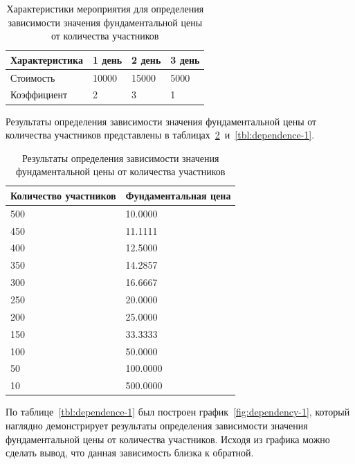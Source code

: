 \begin{table}[H]
	\centering
	\caption{Характеристики мероприятия для определения зависимости значения фундаментальной цены от количества участников}
	\label{tbl:event-chars-1}
	\begin{tabularx}{\textwidth}{|X|X|X|X|}
		\hline
		\textbf{Характеристика} & \textbf{1 день} & \textbf{2 день} & \textbf{3 день} \\
		\hline
		Стоимость & 10000 & 15000 & 5000 \\
		\hline
		Коэффициент & 2 & 3 & 1 \\
		\hline
	\end{tabularx}
\end{table}

Результаты определения зависимости значения фундаментальной цены от количества участников представлены в таблицах~\ref{tbl:short-dependence-1}~и~\ref{tbl:dependence-1}.

\begin{table}[H]
	\centering
	\caption{Результаты определения зависимости значения фундаментальной цены от количества участников}
	\label{tbl:short-dependence-1}
	\begin{tabularx}{\textwidth}{|X|X|}
		\hline
		\textbf{Количество участников} & \textbf{Фундаментальная цена} \\
		\hline
		500  & 10.0000         \\ \hline
		450  & 11.1111         \\ \hline
		400  & 12.5000         \\ \hline
		350  & 14.2857         \\ \hline
		300  & 16.6667         \\ \hline
		250  & 20.0000         \\ \hline
		200  & 25.0000         \\ \hline
		150  & 33.3333         \\ \hline
		100  & 50.0000         \\ \hline
		50   & 100.0000        \\ \hline
		10   & 500.0000        \\ \hline
	\end{tabularx}
\end{table}

По таблице~\ref{tbl:dependence-1} был построен график~\ref{fig:dependency-1}, который наглядно демонстрирует результаты определения зависимости значения фундаментальной цены от количества участников. Исходя из графика можно сделать вывод, что данная зависимость близка к обратной.

